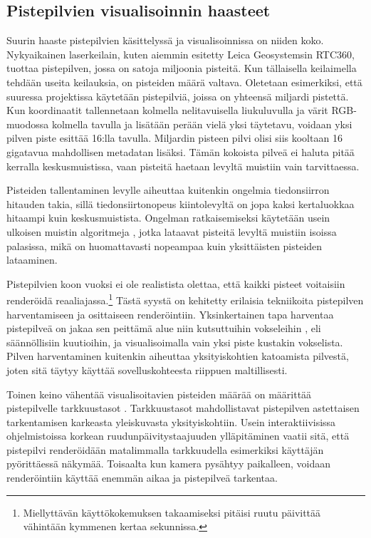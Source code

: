 \subsection{Pistepilvien visualisoinnin haasteet}

Suurin haaste pistepilvien käsittelyssä ja visualisoinnissa on niiden koko. Nykyaikainen laserkeilain, kuten aiemmin esitetty Leica Geosystemsin RTC360, tuottaa pistepilven, jossa on satoja miljoonia pisteitä. Kun tällaisella keilaimella tehdään useita keilauksia, on pisteiden määrä valtava. Oletetaan esimerkiksi, että suuressa projektissa käytetään pistepilviä, joissa on yhteensä miljardi pistettä. Kun koordinaatit tallennetaan kolmella nelitavuisella liukuluvulla ja värit RGB-muodossa kolmella tavulla ja lisätään perään vielä yksi täytetavu, voidaan yksi pilven piste esittää 16:lla tavulla. Miljardin pisteen pilvi olisi siis kooltaan 16 gigatavua mahdollisen metadatan lisäksi. Tämän kokoista pilveä ei haluta pitää kerralla keskusmuistissa, vaan pisteitä haetaan levyltä muistiin vain tarvittaessa. 

Pisteiden tallentaminen levylle aiheuttaa kuitenkin ongelmia tiedonsiirron hitauden takia, sillä tiedonsiirtonopeus kiintolevyltä on jopa kaksi kertaluokkaa hitaampi kuin keskusmuistista. Ongelman ratkaisemiseksi käytetään usein ulkoisen muistin algoritmeja , jotka lataavat pisteitä levyltä muistiin isoissa palasissa, mikä on huomattavasti nopeampaa kuin yksittäisten pisteiden lataaminen. \cite{scheiblauer} 

Pistepilvien koon vuoksi ei ole realistista olettaa, että kaikki pisteet voitaisiin renderöidä reaaliajassa.\footnote{Miellyttävän käyttökokemuksen takaamiseksi pitäisi ruutu päivittää vähintään kymmenen kertaa sekunnissa.} Tästä syystä on kehitetty erilaisia tekniikoita pistepilven harventamiseen ja osittaiseen renderöintiin. Yksinkertainen tapa harventaa pistepilveä on jakaa sen peittämä alue niin kutsuttuihin vokseleihin , eli säännöllisiin kuutioihin, ja visualisoimalla vain yksi piste kustakin vokselista. Pilven harventaminen kuitenkin aiheuttaa yksityiskohtien katoamista pilvestä, joten sitä täytyy käyttää sovelluskohteesta riippuen maltillisesti. 

Toinen keino vähentää visualisoitavien pisteiden määrää on määrittää pistepilvelle tarkkuustasot . Tarkkuustasot mahdollistavat pistepilven astettaisen tarkentamisen karkeasta yleiskuvasta yksityiskohtiin. Usein interaktiivisissa ohjelmistoissa korkean ruudunpäivitystaajuuden ylläpitäminen vaatii sitä, että pistepilvi renderöidään matalimmalla tarkkuudella esimerkiksi käyttäjän pyörittäessä näkymää. Toisaalta kun kamera pysähtyy paikalleen, voidaan renderöintiin käyttää enemmän aikaa ja pistepilveä tarkentaa.


